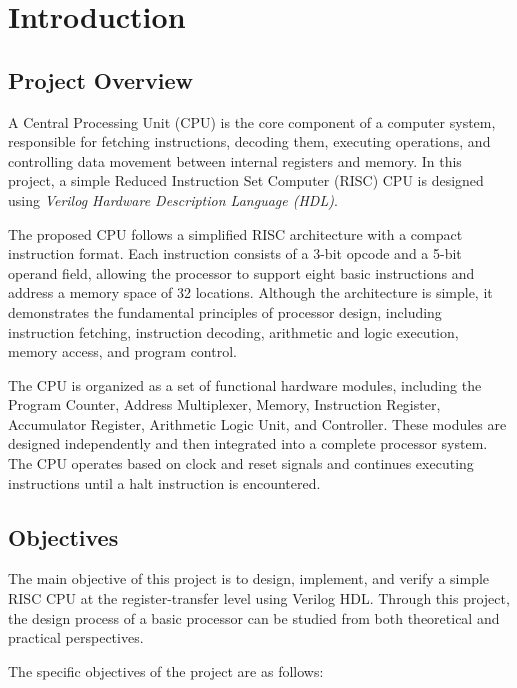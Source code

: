 \section{Introduction}\label{sec:introduction} %

\subsection{Project Overview}

A Central Processing Unit (CPU) is the core component of a computer system, responsible for fetching instructions, decoding them, executing operations, and controlling data movement between internal registers and memory. In this project, a simple Reduced Instruction Set Computer (RISC) CPU is designed using \textit{Verilog Hardware Description Language (HDL)}.

The proposed CPU follows a simplified RISC architecture with a compact instruction format. Each instruction consists of a 3-bit opcode and a 5-bit operand field, allowing the processor to support eight basic instructions and address a memory space of 32 locations. Although the architecture is simple, it demonstrates the fundamental principles of processor design, including instruction fetching, instruction decoding, arithmetic and logic execution, memory access, and program control.

The CPU is organized as a set of functional hardware modules, including the Program Counter, Address Multiplexer, Memory, Instruction Register, Accumulator Register, Arithmetic Logic Unit, and Controller. These modules are designed independently and then integrated into a complete processor system. The CPU operates based on clock and reset signals and continues executing instructions until a halt instruction is encountered.

\subsection{Objectives}

The main objective of this project is to design, implement, and verify a simple RISC CPU at the register-transfer level using Verilog HDL. Through this project, the design process of a basic processor can be studied from both theoretical and practical perspectives.

The specific objectives of the project are as follows:

